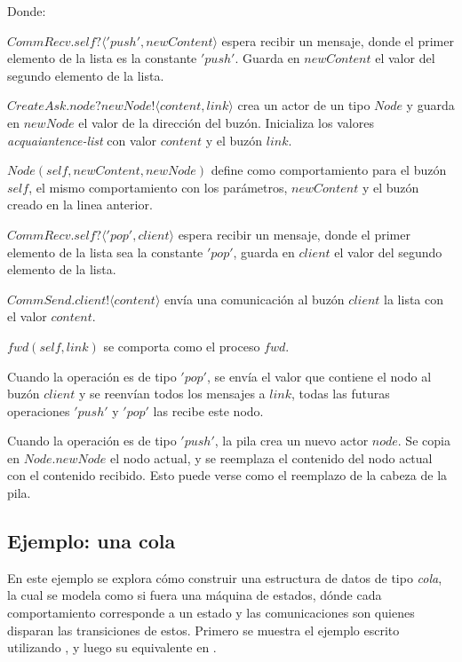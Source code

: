 Donde:

\begin{description}
 \item $CommRecv.self?\langle 'push', newContent \rangle$ espera recibir un mensaje, donde el primer elemento de la lista es la constante $'push'$. Guarda en $newContent$ el valor del segundo elemento de la lista.
 \item $CreateAsk.node?newNode!\langle content, link \rangle$ crea un actor de un tipo $Node$ y guarda en $newNode$ el valor de la dirección del buzón. Inicializa los valores \textit{acquaiantence-list} con valor $content$ y el buzón $link$.
 \item $Node(self, newContent, newNode)$ define como comportamiento para el buzón $self$, el mismo comportamiento con los parámetros, $newContent$ y el buzón creado en la linea anterior.
 \item $CommRecv.self?\langle 'pop', client \rangle$ espera recibir un mensaje, donde el primer elemento de la lista sea la constante $'pop'$, guarda en $client$ el valor del segundo elemento de la lista.
 \item $CommSend.client!\langle content \rangle$ envía una comunicación al buzón $client$ la lista con el valor $content$.
 \item $fwd(self, link)$ se comporta como el proceso $fwd$.
\end{description}

Cuando la operación es de tipo $'pop'$, se envía el valor que contiene el nodo al buzón $client$ y se reenvían todos los mensajes a $link$, todas las futuras operaciones $'push'$ y $'pop'$ las recibe este nodo.

Cuando la operación es de tipo $'push'$, la pila crea un nuevo actor $node$. Se copia en $Node.newNode$ el nodo actual, y se reemplaza el contenido del nodo actual con el contenido recibido. Esto puede verse como el reemplazo de la cabeza de la pila.

\subsection{Ejemplo: una cola}\label{ejemplo:cola}

En este ejemplo se explora cómo construir una estructura de datos de tipo \textit{cola}, la cual se modela como si fuera una máquina de estados, dónde cada comportamiento corresponde a un estado y las comunicaciones son quienes disparan las transiciones de estos. Primero se muestra el ejemplo escrito utilizando \SAL, y luego su equivalente en \CSP.

